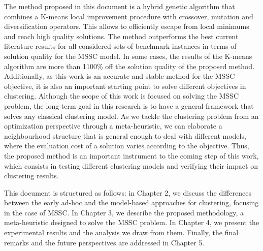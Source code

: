 The method proposed in this document is a hybrid genetic algorithm that combines a K-means local improvement procedure with crossover, mutation and diversification operators. This allows to efficiently escape from local minimums and reach high quality solutions. The method outperforms the best current literature results for all considered sets of benchmark instances in terms of solution quality for the MSSC model. In some cases, the results of the K-means algorithm are more than 1100\% off the solution quality of the proposed method. Additionally, as this work is an accurate and stable method for the MSSC objective, it is also an important starting point to solve different objectives in clustering. Although the scope of this work is focused on solving the MSSC problem, the long-term goal in this research is to have a general framework that solves any classical clustering model. As we tackle the clustering problem from an optimization perspective through a meta-heuristic, we can elaborate a neighbourhood structure that is general enough to deal with different models, where the evaluation cost of a solution varies according to the objective. Thus, the proposed method is an important instrument to the coming step of this work, which consists in testing different clustering models and verifying their impact on clustering results.

This document is structured as follows: in Chapter 2, we discuss the differences between the early ad-hoc and the model-based approaches for clustering, focusing in the case of MSSC. In Chapter 3, we describe the proposed methodology, a meta-heuristic designed to solve the MSSC problem. In Chapter 4, we present the experimental results and the analysis we draw from them. Finally, the final remarks and the future perspectives are addressed in Chapter 5.